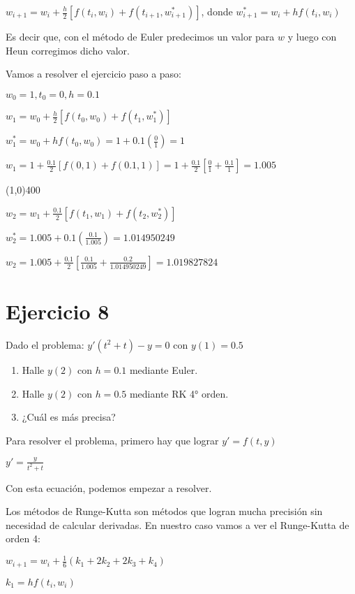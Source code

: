 \documentclass[11pt]{article}
\begin{document}
	$\displaystyle w_{i+1}=w_i+\frac{h}{2}[f(t_i,w_i)+f(t_{i+1}, w_{i+1}^*)]$, donde $w_{i+1}^*=w_i+h f(t_i,w_i)$
	
	Es decir que, con el método de Euler predecimos un valor para $w$ y luego con Heun corregimos dicho valor.
	
	Vamos a resolver el ejercicio paso a paso:
	
	$w_0=1, t_0=0, h=0.1$
	
	$w_1=w_0+\frac{h}{2}[f(t_0,w_0)+f(t_{1}, w_{1}^*)]$
	
	$\displaystyle w_1^*=w_0+hf(t_0, w_0)=1+0.1\left(\frac{0}{1}\right)=1$
	
	$\displaystyle w_1 = 1+\frac{0.1}{2}\left[f(0,1)+f(0.1,1)\right]=1+\frac{0.1}{2}\left[\frac{0}{1}+\frac{0.1}{1}\right]=1.005$
	
	\line(1,0){400}
	
	$\displaystyle w_2=w_1+\frac{0.1}{2}\left[f(t_1,w_1)+f(t_2, w_2^*)\right]$
	
	$\displaystyle w_2^*=1.005+0.1(\frac{0.1}{1.005})=1.014950249$
	
	$\displaystyle w_2=1.005+\frac{0.1}{2}\left[\frac{0.1}{1.005}+\frac{0.2}{1.014950249}\right]=1.019827824$
	
	
	\section{Ejercicio 8}
	Dado el problema: $y'(t^2+t)-y=0$ con $y(1)=0.5$
	
	\begin{enumerate}[label=\alph*)]
		\item Halle $y(2)$ con $h=0.1$ mediante Euler.
		\item Halle $y(2)$ con $h=0.5$ mediante RK 4° orden.
		\item ¿Cuál es más precisa?
	\end{enumerate}

	Para resolver el problema, primero hay que lograr $y'=f(t,y)$
	
	$\displaystyle y'=\frac{y}{t^2+t}$
	
	Con esta ecuación, podemos empezar a resolver.
	
	Los métodos de Runge-Kutta son métodos que logran mucha precisión sin necesidad de calcular derivadas. En nuestro caso vamos a ver el Runge-Kutta de orden 4:
	
	$\displaystyle w_{i+1}=w_i+\frac{1}{6}(k_1+2k_2+2k_3+k_4)$
	
	$\displaystyle k_1=hf(t_i,w_i)$
	
\end{document}

